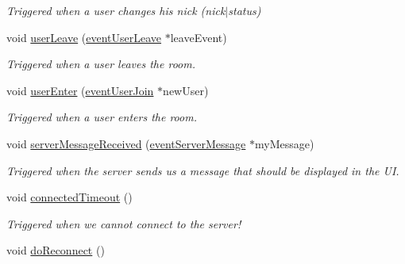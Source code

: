 \begin{DoxyCompactItemize}
\begin{DoxyCompactList}\small\item\em Triggered when a user changes his nick (nick$|$status) \end{DoxyCompactList}\item 
void \hyperlink{classclient_1_1_main_window_a9f16758ff23f279a244806cae35a1604}{user\-Leave} (\hyperlink{classshared_1_1events_1_1event_user_leave}{event\-User\-Leave} $\ast$leave\-Event)
\begin{DoxyCompactList}\small\item\em Triggered when a user leaves the room. \end{DoxyCompactList}\item 
void \hyperlink{classclient_1_1_main_window_a62f7f15ddd56fd52acd7ba01fa6354b4}{user\-Enter} (\hyperlink{classshared_1_1events_1_1event_user_join}{event\-User\-Join} $\ast$new\-User)
\begin{DoxyCompactList}\small\item\em Triggered when a user enters the room. \end{DoxyCompactList}\item 
void \hyperlink{classclient_1_1_main_window_ae738b40e6b83639304d84f3d9f117c75}{server\-Message\-Received} (\hyperlink{classshared_1_1events_1_1event_server_message}{event\-Server\-Message} $\ast$my\-Message)
\begin{DoxyCompactList}\small\item\em Triggered when the server sends us a message that should be displayed in the U\-I. \end{DoxyCompactList}\item 
void \hyperlink{classclient_1_1_main_window_a6df87d6d4bb287478d307d7e45097187}{connected\-Timeout} ()
\begin{DoxyCompactList}\small\item\em Triggered when we cannot connect to the server! \end{DoxyCompactList}\item 
void \hyperlink{classclient_1_1_main_window_a4714272984f1518ea739cc5c809d8579}{do\-Reconnect} ()
\end{DoxyCompactItemize}
